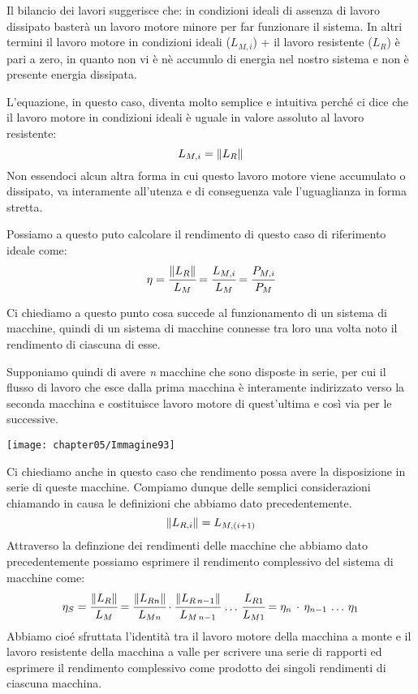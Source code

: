 Il bilancio dei lavori suggerisce che: in condizioni ideali di assenza di lavoro dissipato basterà un lavoro motore minore per far funzionare il sistema. In altri termini il lavoro motore in condizioni ideali ($L_{M,i}$) + il lavoro resistente ($L_R$) è pari a zero, in quanto non vi è nè accumulo di energia nel nostro sistema e non è presente energia dissipata.

L'equazione, in questo caso, diventa molto semplice e intuitiva perché ci dice che il lavoro motore in condizioni ideali è uguale in valore assoluto al lavoro resistente:
\[L_{M,i} = \lVert L_R\rVert\]
Non essendoci alcun altra forma in cui questo lavoro motore viene accumulato o dissipato, va interamente all'utenza e di conseguenza vale l'uguaglianza in forma stretta.

Possiamo a questo puto calcolare il rendimento di questo caso di riferimento ideale come:
\[\eta = \cfrac{\lVert L_R\rVert}{L_M} = \cfrac{L_{M,i}}{L_M} = \cfrac{P_{M,i}}{P_M}\]

Ci chiediamo a questo punto cosa succede al funzionamento di un sistema di macchine, quindi di un sistema di macchine connesse tra loro una volta noto il rendimento di ciascuna di esse.
\vspace{1mm}

\begin{minipage}{.5\textwidth}
Supponiamo quindi di avere \emph{n} macchine che sono disposte in serie, per cui il flusso di lavoro che esce dalla prima macchina è interamente indirizzato verso la seconda macchina e costituisce lavoro motore di quest'ultima e così via per le successive.
\end{minipage}
\hfill
\begin{minipage}{.5\textwidth}
\centering
\texttt{[image: chapter05/Immagine93]}
\end{minipage}
\vspace{1mm}

Ci chiediamo anche in questo caso che rendimento possa avere la disposizione in serie di queste macchine. Compiamo dunque delle semplici considerazioni chiamando in causa le definizioni che abbiamo dato precedentemente.
\[\lVert L_{R,i}\rVert = L_{M,(i+1)}\]
Attraverso la definzione dei rendimenti delle macchine che abbiamo dato precedentemente possiamo esprimere il rendimento complessivo del sistema di macchine come:
\[\eta_S = \cfrac{\lVert L_R\rVert}{L_M} = \cfrac{\lVert L_{Rn}\rVert}{L_{Mn}}\cdot\cfrac{\lVert L_{R\,n-1}\rVert}{L_{M\,n-1}}\,\dots\,\cfrac{L_{R1}}{L_{M1}} = \eta_n\,\cdot\,\eta_{n-1}\,\dots\,\eta_1\]
Abbiamo cioé sfruttata l'identità tra il lavoro motore della macchina a monte e il lavoro resistente della macchina a valle per scrivere una serie di rapporti ed esprimere il rendimento complessivo come prodotto dei singoli rendimenti di ciascuna macchina.

